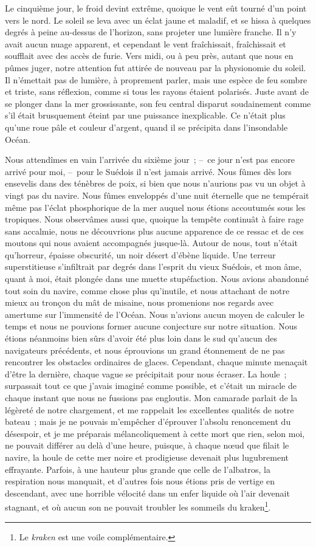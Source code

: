 \documentclass[french,twoside]{book} %
\begin{document}
Le cinquième jour, le froid devint extrême, quoique le vent eût tourné d’un point vers le nord. Le soleil se leva avec un éclat jaune et maladif, et se hissa à quelques degrés à peine au-dessus de l’horizon, sans projeter une lumière franche. Il n’y avait aucun nuage apparent, et cependant le vent fraîchissait, fraîchissait et soufflait avec des accès de furie. Vers midi, ou à peu près, autant que nous en pûmes juger, notre attention fut attirée de nouveau par la physionomie du soleil. Il n’émettait pas de lumière, à proprement parler, mais une espèce de feu sombre et triste, sans réflexion, comme si tous les rayons étaient polarisés. Juste avant de se plonger dans la mer grossissante, son feu central disparut soudainement comme s’il était brusquement éteint par une puissance inexplicable. Ce n’était plus qu’une roue pâle et couleur d’argent, quand il se précipita dans l’insondable Océan.\par
Nous attendîmes en vain l’arrivée du sixième jour ; – ce jour n’est pas encore arrivé pour moi, – pour le Suédois il n’est jamais arrivé. Nous fûmes dès lors ensevelis dans des ténèbres de poix, si bien que nous n’aurions pas vu un objet à vingt pas du navire. Nous fûmes enveloppés d’une nuit éternelle que ne tempérait même pas l’éclat phosphorique de la mer auquel nous étions accoutumés sous les tropiques. Nous observâmes aussi que, quoique la tempête continuât à faire rage sans accalmie, nous ne découvrions plus aucune apparence de ce ressac et de ces moutons qui nous avaient accompagnés jusque-là. Autour de nous, tout n’était qu’horreur, épaisse obscurité, un noir désert d’ébène liquide. Une terreur superstitieuse s’infiltrait par degrés dans l’esprit du vieux Suédois, et mon âme, quant à moi, était plongée dans une muette stupéfaction. Nous avions abandonné tout soin du navire, comme chose plus qu’inutile, et nous attachant de notre mieux au tronçon du mât de misaine, nous promenions nos regards avec amertume sur l’immensité de l’Océan. Nous n’avions aucun moyen de calculer le temps et nous ne pouvions former aucune conjecture sur notre situation. Nous étions néanmoins bien sûrs d’avoir été plus loin dans le sud qu’aucun des navigateurs précédents, et nous éprouvions un grand étonnement de ne pas rencontrer les obstacles ordinaires de glaces. Cependant, chaque minute menaçait d’être la dernière, chaque vague se précipitait pour nous écraser. La houle ; surpassait tout ce que j’avais imaginé comme possible, et c’était un miracle de chaque instant que nous ne fussions pas engloutis. Mon camarade parlait de la légèreté de notre chargement, et me rappelait les excellentes qualités de notre bateau ; mais je ne pouvais m’empêcher d’éprouver l’absolu renoncement du désespoir, et je me préparais mélancoliquement à cette mort que rien, selon moi, ne pouvait différer au delà d’une heure, puisque, à chaque nœud que filait le navire, la houle de cette mer noire et prodigieuse devenait plus lugubrement effrayante. Parfois, à une hauteur plus grande que celle de l’albatros, la respiration nous manquait, et d’autres fois nous étions pris de vertige en descendant, avec une horrible vélocité dans un enfer liquide où l’air devenait stagnant, et où aucun son ne pouvait troubler les sommeils du kraken\footnote{Le \emph{kraken} est une voile complémentaire.}.\par
\end{document}
